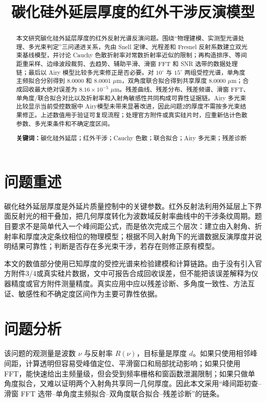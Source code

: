 \documentclass[UTF8]{ctexart}
\title{碳化硅外延层厚度的红外干涉反演模型}
\author{}
\date{}
\begin{document}
\maketitle
\begin{abstract}
本文研究碳化硅外延层厚度的红外反射光谱反演问题。围绕“物理建模、实测型光谱处理、多光束判定”三问递进关系，先由 Snell 定律、光程差和 Fresnel 反射系数建立双光束基线模型，并讨论 Cauchy 色散折射率对常数折射率近似的限制；再构造排序、等间距重采样、边缘波段裁剪、去趋势、辅助平滑、滑窗 FFT 和 SNR 选带的数据处理链；最后以 Airy 模型比较多光束修正是否必要。对 $10^\circ$ 与 $15^\circ$ 两组受控光谱，单角度主频拟合分别得到 8.0000 和 8.0001 $\mu\mathrm{m}$，双角度联合拟合得到共享厚度 8.0000 $\mu\mathrm{m}$；合成回收最大绝对误差为 $8.16\times10^{-5}$ $\mu\mathrm{m}$。残差曲线、残差分布、残差频谱、滑窗 FFT、单角度/联合拟合对比以及折射率和入射角敏感性共同构成可靠性证据链。Airy 多光束比较显示当前受控数据中 Airy模型未带来显著改进，因此问题2的厚度不需按多光束结果修正。上述数值用于验证可复现流程；处理官方附件或真实硅片时，应重新估计色散参数、多光束条件和不确定度区间。

\textbf{关键词：}碳化硅外延层；红外干涉；Cauchy 色散；联合拟合；Airy 多光束；残差诊断
\end{abstract}

\section{问题重述}
碳化硅外延层厚度是外延片质量控制中的关键参数。红外反射法利用外延层上下界面反射光的相干叠加，把几何厚度转化为波数域反射率曲线中的干涉条纹周期。题目要求不是简单代入一个峰间距公式，而是依次完成三个层次：建立由入射角、折射率和厚度决定条纹相位的物理模型；根据不同入射角下的光谱数据反演厚度并说明结果可靠性；判断是否存在多光束干涉，若存在则修正原有模型。

本文的数值部分使用已知厚度的受控光谱来检验建模和计算链路。由于没有引入官方附件3/4或真实硅片数据，文中可报告合成回收误差，但不能把该误差解释为仪器精度或官方附件测量精度。真实应用中应以残差诊断、多角度一致性、方法互证、敏感性和不确定度区间作为主要可靠性依据。

\section{问题分析}
该问题的观测量是波数 $\nu$ 与反射率 $R(\nu)$，目标量是厚度 $d$。如果只使用相邻峰间距，计算透明但容易受峰值定位、平滑窗口和局部扰动影响；如果只使用 FFT，能快速给出主频量级，但会受到频率栅格和窗函数泄漏限制；如果只做单角度拟合，又难以证明两个入射角共享同一几何厚度。因此本文采用“峰间距初查--滑窗 FFT 选带--单角度主频拟合--双角度联合拟合--残差诊断”的链条。
\end{document}
